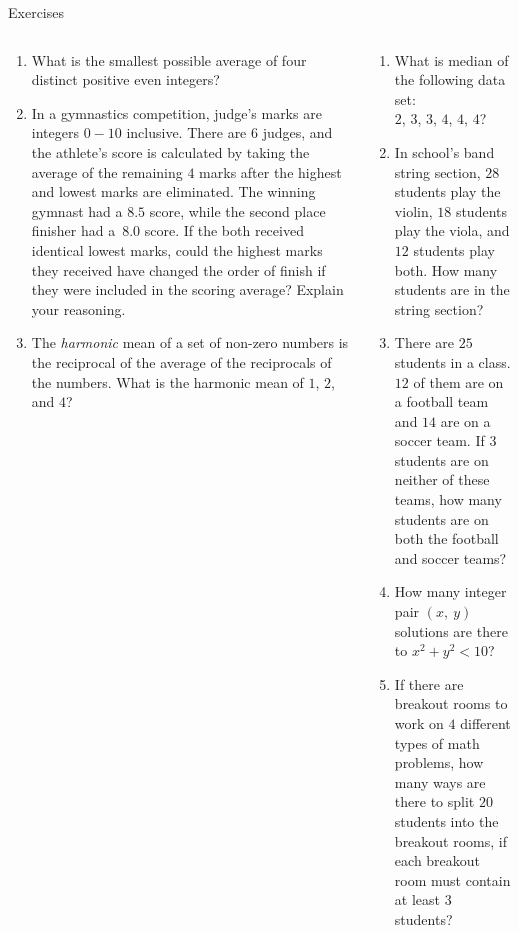 \documentclass[9pt,aspectratio=169]{beamer}
\begin{document}
\begin{frame}{Exercises}
  \begin{columns}[T]
    \begin{column}{0.5\textwidth}
      \begin{enumerate}
        \item What is the smallest possible average of four distinct positive even integers?
        \item In a gymnastics competition, judge’s marks are integers $0-10$ inclusive.  There are $6$ judges, and the athlete's score is calculated by taking the average of the remaining $4$ marks after the highest and lowest marks are eliminated.  The winning gymnast had a $8.5$ score, while the second place finisher had a~$8.0$ score.  If the both received identical lowest marks, could the highest marks they received have changed the order of finish if they were included in the scoring average?  Explain your reasoning.
        \item The \emph{harmonic} mean of a set of non-zero numbers is the reciprocal of the average of the reciprocals of the numbers. 
        What is the harmonic mean of $1$, $2$, and $4$?
        \seti
      \end{enumerate}
    \end{column}
    \begin{column}{0.5\textwidth}
      \begin{enumerate}
        \conti
        \item What is median of the following data set:\\ $2$, $3$, $3$, $4$, $4$, $4$?
        \item In school's band string section, $28$ students play the violin, $18$ students play the viola, and $12$ students play both.  How many students are in the string section?
        \item There are $25$ students in a class. $12$ of them are on a football team and $14$ are on a soccer team. If $3$ students are on neither of these teams, how many students are on both the football and soccer teams?
        \item How many integer pair $(x,\ y)$ solutions are there to $x^2 + y^2 < 10$?
        \item If there are breakout rooms to work on $4$ different types of math problems, how many ways are there to split $20$ students into the breakout rooms, if each breakout room must contain at least $3$ students?
      \end{enumerate}
    \end{column}
  \end{columns}
\end{frame}
\end{document}
